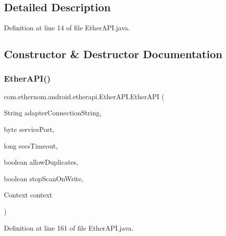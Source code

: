 \subsection{Detailed Description}


Definition at line 14 of file Ether\+A\+P\+I.\+java.



\subsection{Constructor \& Destructor Documentation}
\mbox{\label{classcom_1_1ethernom_1_1android_1_1etherapi_1_1_ether_a_p_i_a728fd002f0533c356fe852b83500b419}} 
\subsubsection{\texorpdfstring{Ether\+A\+P\+I()}{EtherAPI()}}
{\footnotesize\ttfamily com.\+ethernom.\+android.\+etherapi.\+Ether\+A\+P\+I.\+Ether\+A\+PI (\begin{DoxyParamCaption}\item[{String}]{adapter\+Connection\+String,  }\item[{byte}]{service\+Port,  }\item[{long}]{secs\+Timeout,  }\item[{boolean}]{allow\+Duplicates,  }\item[{boolean}]{stop\+Scan\+On\+Write,  }\item[{Context}]{context }\end{DoxyParamCaption})}



Definition at line 161 of file Ether\+A\+P\+I.\+java.

